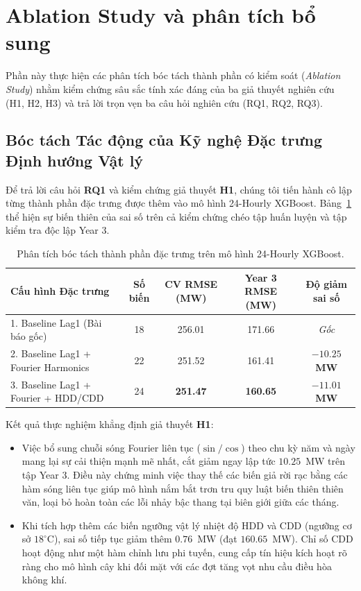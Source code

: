 \section{Ablation Study và phân tích bổ sung}
\label{sec:ablation_study}

Phần này thực hiện các phân tích bóc tách thành phần có kiểm soát (\textit{Ablation Study}) nhằm kiểm chứng sâu sắc tính xác đáng của ba giả thuyết nghiên cứu (H1, H2, H3) và trả lời trọn vẹn ba câu hỏi nghiên cứu (RQ1, RQ2, RQ3).

\subsection{Bóc tách Tác động của Kỹ nghệ Đặc trưng Định hướng Vật lý}
Để trả lời câu hỏi \textbf{RQ1} và kiểm chứng giả thuyết \textbf{H1}, chúng tôi tiến hành cô lập từng thành phần đặc trưng được thêm vào mô hình 24-Hourly XGBoost. Bảng~\ref{tab:ablation_features} thể hiện sự biến thiên của sai số trên cả kiểm chứng chéo tập huấn luyện và tập kiểm tra độc lập Year 3.

\begin{table}[htbp]
    \centering
    \caption{Phân tích bóc tách thành phần đặc trưng trên mô hình 24-Hourly XGBoost.}
    \label{tab:ablation_features}
    \begin{tabular}{lcccc}
        \toprule
        \textbf{Cấu hình Đặc trưng} & \textbf{Số biến} & \textbf{CV RMSE (MW)} & \textbf{Year 3 RMSE (MW)} & \textbf{Độ giảm sai số} \\
        \midrule
        1. Baseline Lag1 (Bài báo gốc) & 18 & 256.01 & 171.66 & \textit{Gốc} \\
        2. Baseline Lag1 + Fourier Harmonics & 22 & 251.52 & 161.41 & \textbf{$-10.25$ MW} \\
        3. Baseline Lag1 + Fourier + HDD/CDD & 24 & \textbf{251.47} & \textbf{160.65} & \textbf{$-11.01$ MW} \\
        \bottomrule
    \end{tabular}
\end{table}

Kết quả thực nghiệm khẳng định giả thuyết \textbf{H1}:
\begin{itemize}
    \item Việc bổ sung chuỗi sóng Fourier liên tục ($\sin/\cos$) theo chu kỳ năm và ngày mang lại sự cải thiện mạnh mẽ nhất, cắt giảm ngay lập tức $10.25$~MW trên tập Year 3. Điều này chứng minh việc thay thế các biến giả rời rạc bằng các hàm sóng liên tục giúp mô hình nắm bắt trơn tru quy luật biến thiên thiên văn, loại bỏ hoàn toàn các lỗi nhảy bậc thang tại biên giới giữa các tháng.
    \item Khi tích hợp thêm các biến ngưỡng vật lý nhiệt độ HDD và CDD (ngưỡng cơ sở $18^\circ\text{C}$), sai số tiếp tục giảm thêm $0.76$~MW (đạt $160.65$~MW). Chỉ số CDD hoạt động như một hàm chỉnh lưu phi tuyến, cung cấp tín hiệu kích hoạt rõ ràng cho mô hình cây khi đối mặt với các đợt tăng vọt nhu cầu điều hòa không khí.
\end{itemize}

